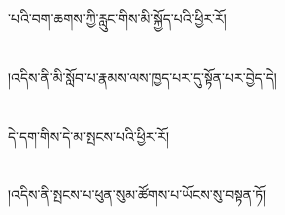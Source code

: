 ་པའི་བག་ཆགས་ཀྱི་རླུང་གིས་མི་སྐྱོད་པའི་ཕྱིར་རོ།\chapter{ }།འདིས་ནི་མི་སློབ་པ་རྣམས་ལས་ཁྱད་པར་དུ་སྟོན་པར་བྱེད་དེ།\chapter{ }དེ་དག་གིས་དེ་མ་སྤངས་པའི་ཕྱིར་རོ།\chapter{ }།འདིས་ནི་སྤངས་པ་ཕུན་སུམ་ཚོགས་པ་ཡོངས་སུ་བསྟན་ཏོ།\chap